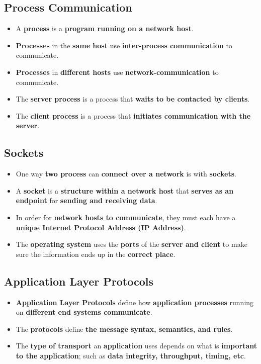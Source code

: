 \documentclass[16pt]{article}
\begin{document}
    \subsection*{Process Communication}
    \begin{itemize}
        \item A \textbf{process} is a \textbf{program running on a network host}.
        \item \textbf{Processes} in the \textbf{same host} use \textbf{inter-process communication} to communicate.
        \item \textbf{Processes} in \textbf{different hosts} use \textbf{network-communication} to communicate.
        \item The \textbf{server process} is a process that \textbf{waits to be contacted by clients}.
        \item The \textbf{client process} is a process that \textbf{initiates communication with the server}.
    \end{itemize}

    \subsection*{Sockets}
    \begin{itemize}
        \item One way \textbf{two process} can \textbf{connect over a network} is with \textbf{sockets}.
        \item A \textbf{socket} is a \textbf{structure within a network host} that \textbf{serves as an endpoint} for \textbf{sending and receiving data}.
        \item In order for \textbf{network hosts to communicate}, they must each have a \textbf{unique Internet Protocol Address (IP Address)}.
        \item The \textbf{operating system} uses the \textbf{ports} of the \textbf{server and client} to make sure the information ends up in the \textbf{correct place}.
    \end{itemize}

    \subsection*{Application Layer Protocols}
    \begin{itemize}
        \item \textbf{Application Layer Protocols} define how \textbf{application processes} running on \textbf{different end systems communicate}.
        \item The \textbf{protocols} define \textbf{the message syntax, semantics, and rules}.
        \item The \textbf{type of transport} an \textbf{application} uses depends on what is \textbf{important to the application}; such as \textbf{data integrity, throughput, timing, etc}.
    \end{itemize}
\end{document}
